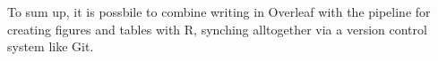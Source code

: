 To sum up, it is possbile to combine writing in Overleaf with the pipeline for creating figures and tables with R, synching alltogether via a version control system like Git.

\textcolor{gray}{\lipsum[11]}